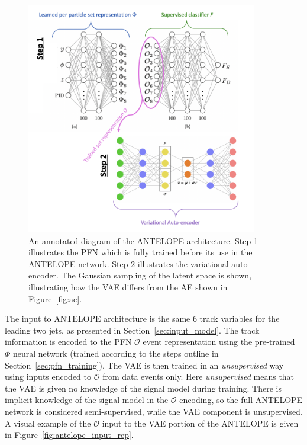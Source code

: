\begin{figure}[!htbp]
\centering
   \includegraphics[width=0.9\textwidth]{figures/ml/antelope_arch}
    \caption{An annotated diagram of the ANTELOPE architecture. Step 1 illustrates the PFN which is fully trained before its use in the ANTELOPE network. Step 2 illustrates the variational auto-encoder. The Gaussian sampling of the latent space is shown, illustrating how the VAE differs from the AE shown in Figure~\ref{fig:ae}. 
    \label{fig:antelope_arch}}
\end{figure}

The input to ANTELOPE architecture is the same 6 track variables for the leading two jets, as presented in Section~\ref{sec:input_model}. The track information is encoded to the PFN $\mathcal{O}$ event representation using the pre-trained $\Phi$ neural network (trained according to the steps outline in Section~\ref{sec:pfn_training}). The VAE is then trained in an \textit{unsupervised} way using inputs encoded to $\mathcal{O}$ from data events only. Here \textit{unsupervised} means that the VAE is given no knowledge of the signal model during training. There is implicit knowledge of the signal model in the $\mathcal{O}$ encoding, so the full ANTELOPE network is considered semi-supervised, while the VAE component is unsupervised. A visual example of the $\mathcal{O}$ input to the VAE portion of the ANTELOPE is given in Figure~\ref{fig:antelope_input_rep}. 

